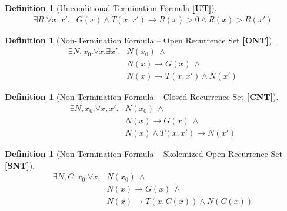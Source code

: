 \documentclass[preprint]{sigplanconf}
\theoremstyle{definition}
\newtheorem{definition}[theorem]{Definition}
\begin{document}
\begin{figure*}
\begin{framed}
\begin{definition}[Unconditional Termination Formula {\bf [UT]}]
\label{def:UT}
\begin{align*}
 \exists R . \forall x, x' . & G(x) \wedge T(x, x') \rightarrow R(x) > 0 \wedge R(x) > R(x')
\end{align*}
\end{definition}

\begin{definition}[Non-Termination Formula -- Open Recurrence Set  {\bf [ONT]}]
\label{def:ont}
 \begin{align*}
  \exists N, x_0 . \forall x . \exists x' . & N(x_0) ~\wedge \\ &  N(x) \rightarrow G(x) ~ \wedge \\
							& N(x) \rightarrow T(x, x') \wedge N(x') 
 \end{align*}
\end{definition}

\begin{definition}[Non-Termination Formula -- Closed Recurrence Set {\bf [CNT]}]
\label{def:cnt}
 \begin{align*}
  \exists N, x_0 . \forall x, x' . & N(x_0) ~ \wedge \\ & N(x) \rightarrow G(x) ~ \wedge \\
							& N(x) \wedge T(x, x') \rightarrow N(x') 
 \end{align*}

\begin{definition}[Non-Termination Formula -- Skolemized Open Recurrence Set  {\bf [SNT]}]
\label{def:snt}
 \begin{align*}
  \exists N, C, x_0 . \forall x . & N(x_0) ~\wedge \\ &  N(x) \rightarrow G(x) ~ \wedge \\
							& N(x) \rightarrow T(x, C(x)) \wedge N(C(x))
 \end{align*}
\end{definition}

\end{definition}


\end{framed}
\end{figure*}
\end{document}
